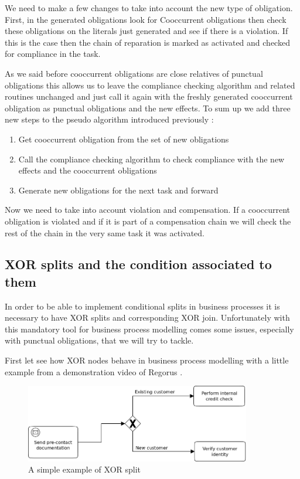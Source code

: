 \documentclass[10pt]{report}
\begin{document}
We need to make a few changes to take into account the new type of obligation. First, in the generated obligations look for Cooccurrent obligations then check these obligations on the literals just generated and see if there is a violation. If this is the case then the chain of reparation is marked as activated and checked for compliance in the task.

As we said before cooccurrent obligations are close relatives of punctual obligations this allows us to leave the compliance checking algorithm and related routines unchanged and just call it again with the freshly generated cooccurrent obligation as punctual obligations and the new effects. To sum up we add three new steps to the pseudo algorithm introduced previously :
\begin{enumerate}
\item Get cooccurrent obligation from the set of new obligations
\item Call the compliance checking algorithm to check compliance with the new effects and the cooccurrent obligations
\item Generate new obligations for the next task and forward
\end{enumerate}

Now we need to take into account violation and compensation. If a cooccurrent obligation is violated and if it is part of a compensation chain we will check the rest of the chain in the very same task it was activated.



\subsection{XOR splits and the condition associated to them}
In order to be able to implement conditional splits in business processes it is necessary to have XOR splits and corresponding XOR join. Unfortunately with this mandatory tool for business process modelling comes some issues, especially with punctual obligations, that we will try to tackle.

First let see how XOR nodes behave in business process modelling with a little example from a demonstration video of Regorus \autocite{regorusVid}.

\begin{figure}[!h] %
\begin{center}
\includegraphics[height=3.4cm]{XOR.png} %
\caption{A simple example of XOR split} %
\end{center}
\label{image_soleil} %
\end{figure} %
\end{document}

